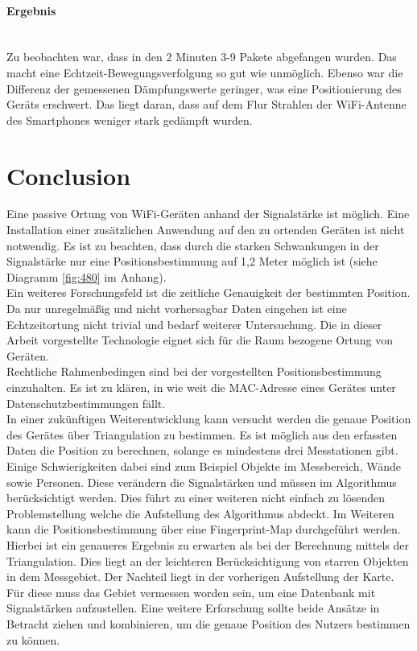 \documentclass[a4paper]{spie}  %
\begin{document}
\paragraph{Ergebnis}\mbox{}\\
Zu beobachten war, dass in den 2 Minuten 3-9 Pakete abgefangen wurden. Das macht eine Echtzeit-Bewegungsverfolgung so gut wie unmöglich. Ebenso war die Differenz der gemessenen Dämpfungswerte geringer, was eine Positionierung des Geräts erschwert. Das liegt daran, dass auf dem Flur Strahlen der WiFi-Antenne des Smartphones weniger stark gedämpft wurden. 


\section{Conclusion}
Eine passive Ortung von WiFi-Geräten anhand der Signalstärke ist möglich. Eine Installation einer zusätzlichen Anwendung auf den zu ortenden Geräten ist nicht notwendig. Es ist zu beachten, dass durch die starken Schwankungen in der Signalstärke nur eine  Positionsbestimmung auf 1,2 Meter möglich ist (siehe Diagramm \ref{fig:480} im Anhang).
\\
Ein weiteres Forschungsfeld ist die zeitliche Genauigkeit der bestimmten Position. Da nur unregelmäßig und nicht vorhersagbar Daten eingehen ist eine Echtzeitortung nicht trivial und bedarf weiterer Untersuchung.
Die in dieser Arbeit vorgestellte Technologie eignet sich für die Raum bezogene Ortung von Geräten. 
\\
Rechtliche Rahmenbedingen sind bei der vorgestellten Positionsbestimmung einzuhalten. Es ist zu klären, in wie weit die MAC-Adresse eines Gerätes unter Datenschutzbestimmungen fällt.
\\
In einer zukünftigen Weiterentwicklung kann versucht werden die genaue Position des Gerätes über Triangulation zu bestimmen. Es ist möglich aus den erfassten Daten die Position zu berechnen, solange es mindestens drei Messtationen gibt. Einige Schwierigkeiten dabei sind zum Beispiel Objekte im Messbereich, Wände sowie Personen. Diese verändern die Signalstärken und müssen im Algorithmus berücksichtigt werden. Dies führt zu einer weiteren nicht einfach zu lösenden Problemstellung welche die Aufstellung des Algorithmus abdeckt. \linebreak
\linebreak
Im Weiteren kann die Positionsbestimmung über eine Fingerprint-Map durchgeführt werden. Hierbei ist ein genaueres Ergebnis zu erwarten als bei der Berechnung mittels der Triangulation. Dies liegt an der leichteren Berücksichtigung von starren Objekten in dem Messgebiet. Der Nachteil liegt in der vorherigen Aufstellung der Karte. Für diese muss das Gebiet vermessen worden sein, um eine Datenbank mit Signalstärken aufzustellen. 
\linebreak
Eine weitere Erforschung sollte beide Ansätze in Betracht ziehen und kombinieren, um die genaue Position des Nutzers bestimmen zu können.
\end{document}
